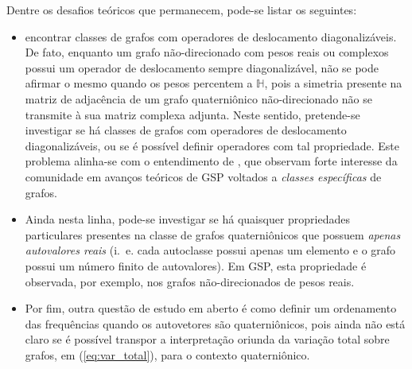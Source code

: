 Dentre os desafios te\'oricos que permanecem, pode-se listar os seguintes:
\begin{itemize}
\item encontrar classes de grafos com operadores de deslocamento diagonaliz\'aveis. De fato, enquanto um grafo n\~ao-direcionado com pesos reais ou complexos possui um operador de deslocamento sempre diagonaliz\'avel, n\~ao se pode afirmar o mesmo quando os pesos percentem a $ \mathbb{H} $, pois a simetria presente na matriz de adjac\^encia de um grafo quaterni\^onico n\~ao-direcionado n\~ao se transmite \`a sua matriz complexa adjunta. Neste sentido, pretende-se investigar se h\'a classes de grafos com operadores de deslocamento diagonaliz\'aveis, ou se \'e poss\'ivel definir operadores com tal propriedade. Este problema alinha-se com o entendimento de \cite{ortega2018graph}, que observam forte interesse da comunidade em avan\c cos te\'oricos de GSP voltados a \emph{classes espec\'ificas} de grafos.
\item Ainda nesta linha, pode-se investigar se h\'a quaisquer propriedades particulares presentes na classe de grafos quaterni\^onicos que possuem \emph{apenas autovalores reais} (i.~e. cada autoclasse possui apenas um elemento e o grafo possui um n\'umero finito de autovalores). Em GSP, esta propriedade \'e observada, por exemplo, nos grafos n\~ao-direcionados de pesos reais.
\item Por fim, outra quest\~ao de estudo em aberto \'e como definir um ordenamento das frequ\^encias quando os autovetores s\~ao quaterni\^onicos, pois ainda n\~ao est\'a claro se \'e poss\'ivel transpor a interpreta\c c\~ao oriunda da varia\c c\~ao total sobre grafos, em (\ref{eq:var_total}), para o contexto quaterni\^onico.
\end{itemize}

